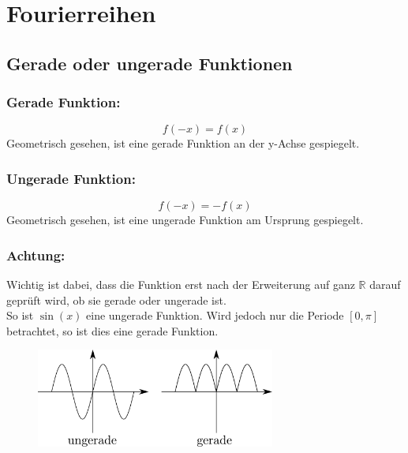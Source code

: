 



\section{Fourierreihen}

\subsection{Gerade oder ungerade Funktionen}

\subsubsection{Gerade Funktion: }
\[ \boxed{f(-x) = f(x)} \]
Geometrisch gesehen, ist eine gerade Funktion an der y-Achse gespiegelt.
\subsubsection{Ungerade Funktion: }
\[ \boxed{f(-x) = -f(x)} \]
Geometrisch gesehen, ist eine ungerade Funktion am Ursprung gespiegelt.
\subsubsection{Achtung: }
Wichtig ist dabei, dass die Funktion erst nach der Erweiterung auf ganz $\mathbb{R}$ darauf geprüft wird, ob sie gerade oder ungerade ist. \\
So ist $\sin(x)$ eine ungerade Funktion. Wird jedoch nur die Periode $[0, \pi]$ betrachtet, so ist dies eine gerade Funktion.

\begin{figure}[h!]
\centering
\includegraphics[width=0.7\textwidth]{geradeungerade.pdf}
\end{figure}

